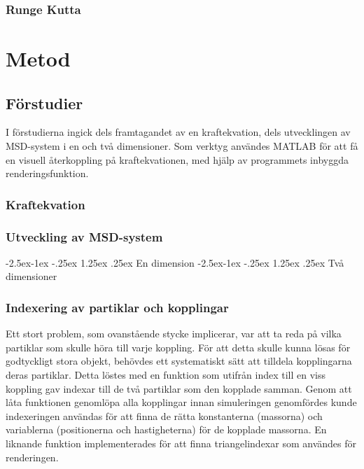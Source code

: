 \documentclass[a4paper,12pt,oneside,final,swedish]{extarticle}
\makeatletter
\renewcommand\paragraph{\@startsection{paragraph}{4}{\z@}%
            {-2.5ex\@plus -1ex \@minus -.25ex}%
            {1.25ex \@plus .25ex}%
            {\normalfont\normalsize\bfseries}}
\makeatother
\begin{document}
\subsubsection{Runge Kutta}%


\section{Metod}
\subsection{Förstudier}
I förstudierna ingick dels framtagandet av en kraftekvation, dels utvecklingen av MSD-system i en och två dimensioner. 
Som verktyg användes MATLAB för att få en visuell återkoppling på kraftekvationen, med hjälp av programmets inbyggda renderingsfunktion.

\subsubsection{Kraftekvation}
\subsubsection{Utveckling av MSD-system}
\paragraph{En dimension}
\paragraph{Två dimensioner}
\subsubsection{Indexering av partiklar och kopplingar}
Ett stort problem, som ovanstående stycke implicerar, var att ta reda på vilka partiklar som skulle höra till varje koppling. 
För att detta skulle kunna lösas för godtyckligt stora objekt, behövdes ett systematiskt sätt att tilldela kopplingarna deras partiklar.
Detta löstes med en funktion som utifrån index till en viss koppling gav indexar till de två partiklar som den kopplade samman. 
Genom att låta funktionen genomlöpa alla kopplingar innan simuleringen genomfördes kunde indexeringen användas för att finna de rätta konstanterna (massorna) och variablerna (positionerna och hastigheterna) för de kopplade massorna. 
En liknande funktion implementerades för att finna triangelindexar som användes för renderingen.
\end{document}
